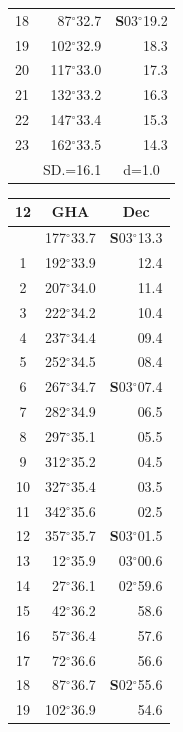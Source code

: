 \documentclass[10pt, a4paper]{report}
\begin{document}
\begin{scriptsize}
\begin{tabular*}{0.2\textwidth}[t]{@{\extracolsep{\fill}}|c|rr|}
18 & 87$^\circ$32.7 & \textbf{S}03$^\circ$19.2\\
19 & 102$^\circ$32.9 & 18.3\\
20 & 117$^\circ$33.0 & 17.3\\
21 & 132$^\circ$33.2 & \raisebox{0.24ex}{\boldmath$\cdot$~\boldmath$\cdot$~~}16.3\\
22 & 147$^\circ$33.4 & 15.3\\
23 & 162$^\circ$33.5 & 14.3\\
\hline
\rule{0pt}{2.4ex} & \multicolumn{1}{c}{SD.=16.1} & \multicolumn{1}{c|}{d=1.0}\\
\hline
\end{tabular*}\noindent
\begin{tabular*}{0.2\textwidth}[t]{@{\extracolsep{\fill}}|c|rr|}
\hline
\multicolumn{1}{|c|}{\rule{0pt}{2.6ex}\textbf{12}} & \multicolumn{1}{c}{\textbf{GHA}} & \multicolumn{1}{c|}{\textbf{Dec}}\\
\hline\rule{0pt}{2.6ex}\noindent
0 & 177$^\circ$33.7 & \textbf{S}03$^\circ$13.3\\
1 & 192$^\circ$33.9 & 12.4\\
2 & 207$^\circ$34.0 & 11.4\\
3 & 222$^\circ$34.2 & \raisebox{0.24ex}{\boldmath$\cdot$~\boldmath$\cdot$~~}10.4\\
4 & 237$^\circ$34.4 & 09.4\\
5 & 252$^\circ$34.5 & 08.4\\[2Pt]
6 & 267$^\circ$34.7 & \textbf{S}03$^\circ$07.4\\
7 & 282$^\circ$34.9 & 06.5\\
8 & 297$^\circ$35.1 & 05.5\\
9 & 312$^\circ$35.2 & \raisebox{0.24ex}{\boldmath$\cdot$~\boldmath$\cdot$~~}04.5\\
10 & 327$^\circ$35.4 & 03.5\\
11 & 342$^\circ$35.6 & 02.5\\[2Pt]
12 & 357$^\circ$35.7 & \textbf{S}03$^\circ$01.5\\
13 & 12$^\circ$35.9 & 03$^\circ$00.6\\
14 & 27$^\circ$36.1 & 02$^\circ$59.6\\
15 & 42$^\circ$36.2 & \raisebox{0.24ex}{\boldmath$\cdot$~\boldmath$\cdot$~~}58.6\\
16 & 57$^\circ$36.4 & 57.6\\
17 & 72$^\circ$36.6 & 56.6\\[2Pt]
18 & 87$^\circ$36.7 & \textbf{S}02$^\circ$55.6\\
19 & 102$^\circ$36.9 & 54.6\\

\end{tabular*}
\end{scriptsize}
\end{document}
